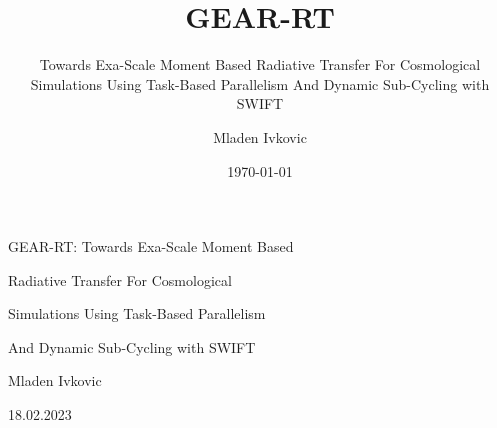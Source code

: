 \title{GEAR-RT}
\subtitle{Towards Exa-Scale Moment Based Radiative Transfer For Cosmological Simulations Using
Task-Based Parallelism And Dynamic Sub-Cycling with SWIFT }
\author{Mladen Ivkovic}
\date{\today}







\begin{titlepage}


\null\vspace{2cm}
{\huge
    GEAR-RT: Towards Exa-Scale Moment Based

    Radiative Transfer For Cosmological

    Simulations Using Task-Based Parallelism

    And Dynamic Sub-Cycling with SWIFT


}



\vspace{1cm}

\vspace{8cm}

Mladen Ivkovic

18.02.2023

\end{titlepage}

\cleardoubleemptypage
